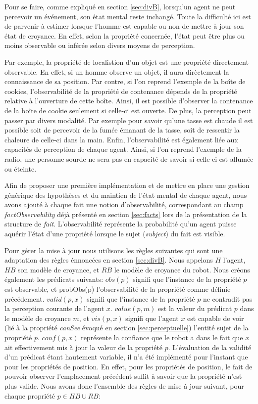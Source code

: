 \documentclass[a4paper,11pt,twoside]{StyleThese}
\begin{document}
Pour se faire, comme expliqué en section \ref{sec:divB}, lorsqu'un agent ne peut percevoir un événement, son état mental reste inchangé.
Toute la difficulté ici est de parvenir à estimer lorsque l'homme est capable ou non de mettre à jour son état de croyance.
En effet, selon la propriété concernée, l'état peut être plus ou moins observable ou inférée selon divers moyens de perception.

Par exemple, la propriété de localistion d'un objet est une propriété directement observable. En effet, si un homme observe un objet, il aura dirèctement la connaissance de sa position. Par contre, si l'on reprend l'exemple de la boîte de cookies, l'observabilité de la propriété de contenance dépends de la propriété relative à l'ouverture de cette boîte. Ainsi, il est possible d'observer la contenance de la boîte de cookie seulement si celle-ci est ouverte.
De plus, la perception peut passer par divers modalité. Par exemple pour savoir qu'une tasse est chaude il est possible soit de percevoir de la fumée émanant de la tasse, soit de ressentir la chaleure de celle-ci dans la main.
Enfin, l'observabilité est également liée aux capacités de perception de chaque agent. Ainsi, si l'on reprend l'exemple de la radio, une personne sourde ne sera pas en capacité de savoir si celle-ci est allumée ou éteinte.

Afin de proposer une première implémentation et de mettre en place une gestion générique des hypothèses et du maintien de l'état mental de chaque agent, nous avons ajouté à chaque fait une notion d'observabilité, correspondant au champ \textit{factObservability} déjà présenté en section \ref{sec:facts} lors de la présentation de la structure de \textit{fait}.
L'observabilité représente la probabilité qu'un agent puisse aquérir l'état d'une propriété lorsque le sujet (\textit{subject}) du fait est visible.

Pour gérer la mise à jour nous utilisons les règles suivantes qui sont une adaptation des règles énnoncées en section \ref{sec:divB}. 
Nous appelons $H$ l'agent, $HB$ son modèle de croyance, et $RB$ le modèle de croyance du robot. Nous créons également les prédicats suivants: $obs(p)$ signifi que l'instance de la propriété $p$ est observable, et probObs(p) l'observabilité de la propriété comme définie précédement. $valid(p,x)$ signifi que l'instance de la propriété $p$ ne contradit pas la perception courante de l'agent $x$. $value(p,m)$ est la valeur du prédicat $p$ dans le modèle de croyance $m$, et $vis(p,x)$ signifi que l'agent $x$ est capable de voir (lié à la propriété \textit{canSee} évoqué en section \ref{sec:perceptuelle}) l'entité sujet de la propriété $p$. $conf(p,x)$ représente la confiance que le robot a dans le fait que $x$ ait effectivement mis à jour la valeur de la propriété $p$. L'évaluation de la validité d'un prédicat étant hautement variable, il n'a été implémenté pour l'instant que pour les propriétés de position. En effet, pour les propriétés de position, le fait de pouvoir observer l'emplacement précédent suffit à savoir que la propriété n'est plus valide.
Nous avons donc l'ensemble des règles de mise à jour suivant, pour chaque propriété  $p\in HB \cup RB$: 
\end{document}
